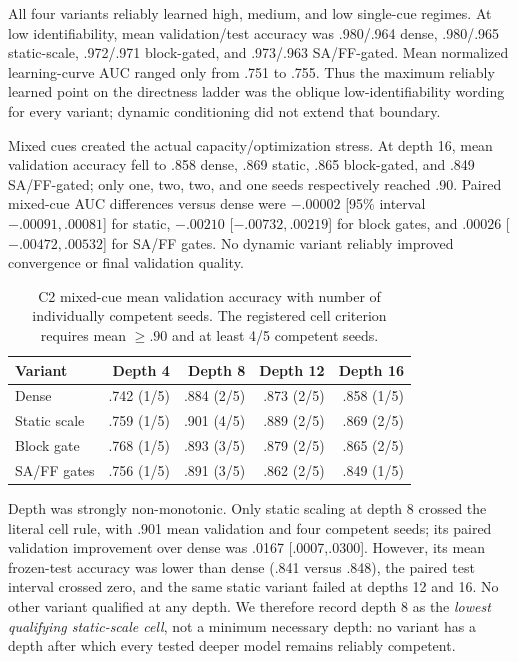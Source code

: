 \documentclass[10pt]{article}
\begin{document}
All four variants reliably learned high, medium, and low single-cue regimes. At low identifiability, mean validation/test accuracy was .980/.964 dense, .980/.965 static-scale, .972/.971 block-gated, and .973/.963 SA/FF-gated. Mean normalized learning-curve AUC ranged only from .751 to .755. Thus the maximum reliably learned point on the directness ladder was the oblique low-identifiability wording for every variant; dynamic conditioning did not extend that boundary.

Mixed cues created the actual capacity/optimization stress. At depth 16, mean validation accuracy fell to .858 dense, .869 static, .865 block-gated, and .849 SA/FF-gated; only one, two, two, and one seeds respectively reached .90. Paired mixed-cue AUC differences versus dense were $-.00002$ [95\% interval $-.00091,.00081$] for static, $-.00210$ [$-.00732,.00219$] for block gates, and $.00026$ [$-.00472,.00532$] for SA/FF gates. No dynamic variant reliably improved convergence or final validation quality.

\begin{table}[ht]
\centering
\small
\begin{tabular}{lrrrr}
\toprule
Variant & Depth 4 & Depth 8 & Depth 12 & Depth 16 \\
\midrule
Dense & .742 (1/5) & .884 (2/5) & .873 (2/5) & .858 (1/5) \\
Static scale & .759 (1/5) & .901 (4/5) & .889 (2/5) & .869 (2/5) \\
Block gate & .768 (1/5) & .893 (3/5) & .879 (2/5) & .865 (2/5) \\
SA/FF gates & .756 (1/5) & .891 (3/5) & .862 (2/5) & .849 (1/5) \\
\bottomrule
\end{tabular}
\caption{C2 mixed-cue mean validation accuracy with number of individually competent seeds. The registered cell criterion requires mean $\geq.90$ and at least 4/5 competent seeds.}
\end{table}

Depth was strongly non-monotonic. Only static scaling at depth 8 crossed the literal cell rule, with .901 mean validation and four competent seeds; its paired validation improvement over dense was .0167 [.0007,.0300]. However, its mean frozen-test accuracy was lower than dense (.841 versus .848), the paired test interval crossed zero, and the same static variant failed at depths 12 and 16. No other variant qualified at any depth. We therefore record depth 8 as the \emph{lowest qualifying static-scale cell}, not a minimum necessary depth: no variant has a depth after which every tested deeper model remains reliably competent.
\end{document}
